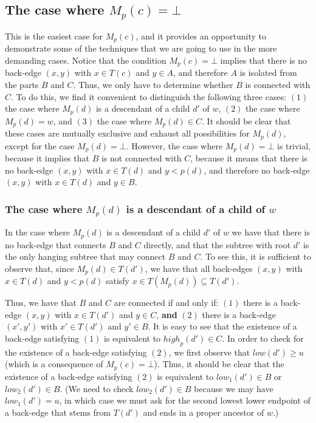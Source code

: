 \documentclass[11pt,a4paper]{article}
\begin{document}
\subsection{The case where $M_p(c)=\bot$}
\label{section:M(c)=bot}
This is the easiest case for $M_p(c)$, and it provides an opportunity to demonstrate some of the techniques that we are going to use in the more demanding cases. Notice that the condition $M_p(c)=\bot$ implies that there is no back-edge $(x,y)$ with $x\in T(c)$ and $y\in A$, and therefore $A$ is isolated from the parts $B$ and $C$. Thus, we only have to determine whether $B$ is connected with $C$. To do this, we find it convenient to distinguish the following three cases: $(1)$ the case where $M_p(d)$ is a descendant of a child $d'$ of $w$, $(2)$ the case where $M_p(d)=w$, and $(3)$ the case where $M_p(d)\in C$. It should be clear that these cases are mutually exclusive and exhaust all possibilities for $M_p(d)$, except for the case $M_p(d)=\bot$. However, the case where $M_p(d)=\bot$ is trivial, because it implies that $B$ is not connected with $C$, because it means that there is no back-edge $(x,y)$ with $x\in T(d)$ and $y<p(d)$, and therefore no back-edge $(x,y)$ with $x\in T(d)$ and $y\in B$.

\subsubsection{The case where $M_p(d)$ is a descendant of a child of $w$}
In the case where $M_p(d)$ is a descendant of a child $d'$ of $w$ we have that there is no back-edge that connects $B$ and $C$ directly, and that the subtree with root $d'$ is the only hanging subtree that may connect $B$ and $C$. To see this, it is sufficient to observe that, since $M_p(d)\in T(d')$, we have that all back-edges $(x,y)$ with $x\in T(d)$ and $y<p(d)$ satisfy $x\in T(M_p(d))\subseteq T(d')$. 

Thus, we have that $B$ and $C$ are connected if and only if: $(1)$ there is a back-edge $(x,y)$ with $x\in T(d')$ and $y\in C$, \textbf{and} $(2)$ there is a back-edge $(x',y')$ with $x'\in T(d')$ and $y'\in B$. It is easy to see that the existence of a back-edge satisfying $(1)$ is equivalent to $\mathit{high}_p(d')\in C$. In order to check for the existence of a back-edge satisfying $(2)$, we first observe that $\mathit{low}(d')\geq u$ (which is a consequence of $M_p(c)=\bot$). Thus, it should be clear that the existence of a back-edge satisfying $(2)$ is equivalent to $\mathit{low}_1(d')\in B$ or $\mathit{low}_2(d')\in B$. (We need to check $\mathit{low}_2(d')\in B$ because we may have $\mathit{low}_1(d')=u$, in which case we must ask for the second lowest lower endpoint of a back-edge that stems from $T(d')$ and ends in a proper ancestor of $w$.)
\end{document}
